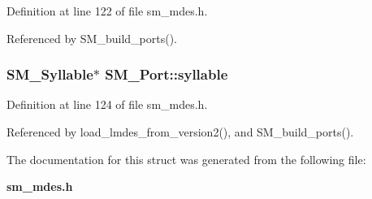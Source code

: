 Definition at line 122 of file sm\_\-mdes.h.

Referenced by SM\_\-build\_\-ports().
\subsubsection{\setlength{\rightskip}{0pt plus 5cm}\bf{SM\_\-Syllable}$\ast$ \bf{SM\_\-Port::syllable}}\label{structSM__Port_6db15bfba527aaaca2e7c01733fb0ea4}




Definition at line 124 of file sm\_\-mdes.h.

Referenced by load\_\-lmdes\_\-from\_\-version2(), and SM\_\-build\_\-ports().

The documentation for this struct was generated from the following file:\begin{CompactItemize}
\item 
\bf{sm\_\-mdes.h}\end{CompactItemize}
